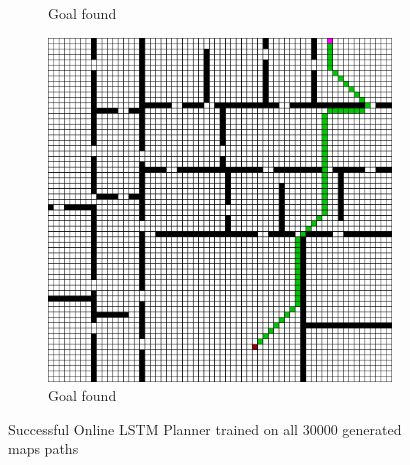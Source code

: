 \begin{figure}[h!]
\begin{subfigure}[b]{0.33\linewidth}
     \caption{Goal found}
  \end{subfigure}
  \hfill
  \begin{subfigure}[b]{0.33\linewidth}
    \includegraphics[width=\linewidth]{images/lstm_3_all.png}
     \caption{Goal found}
  \end{subfigure}
  \caption{Successful Online LSTM Planner trained on all 30000 generated maps paths}
  \label{fig: lstm path success}
\end{figure}

